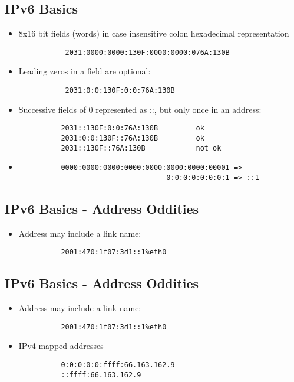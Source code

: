 \documentclass[xga]{xdvislides}
\begin{document}
\subsection{IPv6 Basics}
\begin{itemize}
	\item 8x16 bit fields (words) in case insensitive colon hexadecimal
		representation
\begin{verbatim}
           2031:0000:0000:130F:0000:0000:076A:130B
\end{verbatim}
	\item Leading zeros in a field are optional:
\begin{verbatim}
           2031:0:0:130F:0:0:76A:130B
\end{verbatim}
	\item Successive fields of 0 represented as ::, but only once in
			an address:
\begin{verbatim}
          2031::130F:0:0:76A:130B         ok
          2031:0:0:130F::76A:130B         ok
          2031::130F::76A:130B            not ok
\end{verbatim}
	\item
\begin{verbatim}
          0000:0000:0000:0000:0000:0000:0000:00001 =>
                                   0:0:0:0:0:0:0:1 => ::1
\end{verbatim}
\end{itemize}

\subsection{IPv6 Basics - Address Oddities}
\begin{itemize}
	\item Address may include a link name:
\begin{verbatim}
          2001:470:1f07:3d1::1%eth0
\end{verbatim}
\end{itemize}

\subsection{IPv6 Basics - Address Oddities}
\begin{itemize}
	\item Address may include a link name:
\begin{verbatim}
          2001:470:1f07:3d1::1%eth0
\end{verbatim}
	\item IPv4-mapped addresses
\begin{verbatim}
          0:0:0:0:0:ffff:66.163.162.9
          ::ffff:66.163.162.9
\end{verbatim}
\end{itemize}
\end{document}

